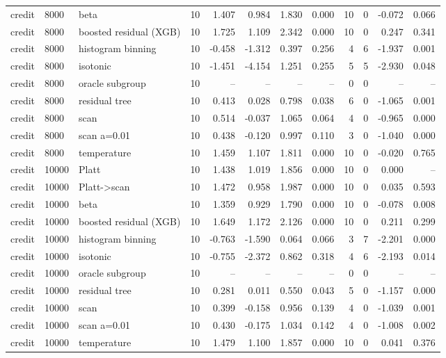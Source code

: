 \begin{tabular}{lllrrrrrrrrr}
credit & 8000 & beta & 10 & 1.407 & 0.984 & 1.830 & 0.000 & 10 & 0 & -0.072 & 0.066 \\
credit & 8000 & boosted residual (XGB) & 10 & 1.725 & 1.109 & 2.342 & 0.000 & 10 & 0 & 0.247 & 0.341 \\
credit & 8000 & histogram binning & 10 & -0.458 & -1.312 & 0.397 & 0.256 & 4 & 6 & -1.937 & 0.001 \\
credit & 8000 & isotonic & 10 & -1.451 & -4.154 & 1.251 & 0.255 & 5 & 5 & -2.930 & 0.048 \\
credit & 8000 & oracle subgroup & 10 & -- & -- & -- & -- & 0 & 0 & -- & -- \\
credit & 8000 & residual tree & 10 & 0.413 & 0.028 & 0.798 & 0.038 & 6 & 0 & -1.065 & 0.001 \\
credit & 8000 & scan & 10 & 0.514 & -0.037 & 1.065 & 0.064 & 4 & 0 & -0.965 & 0.000 \\
credit & 8000 & scan a=0.01 & 10 & 0.438 & -0.120 & 0.997 & 0.110 & 3 & 0 & -1.040 & 0.000 \\
credit & 8000 & temperature & 10 & 1.459 & 1.107 & 1.811 & 0.000 & 10 & 0 & -0.020 & 0.765 \\
credit & 10000 & Platt & 10 & 1.438 & 1.019 & 1.856 & 0.000 & 10 & 0 & 0.000 & -- \\
credit & 10000 & Platt->scan & 10 & 1.472 & 0.958 & 1.987 & 0.000 & 10 & 0 & 0.035 & 0.593 \\
credit & 10000 & beta & 10 & 1.359 & 0.929 & 1.790 & 0.000 & 10 & 0 & -0.078 & 0.008 \\
credit & 10000 & boosted residual (XGB) & 10 & 1.649 & 1.172 & 2.126 & 0.000 & 10 & 0 & 0.211 & 0.299 \\
credit & 10000 & histogram binning & 10 & -0.763 & -1.590 & 0.064 & 0.066 & 3 & 7 & -2.201 & 0.000 \\
credit & 10000 & isotonic & 10 & -0.755 & -2.372 & 0.862 & 0.318 & 4 & 6 & -2.193 & 0.014 \\
credit & 10000 & oracle subgroup & 10 & -- & -- & -- & -- & 0 & 0 & -- & -- \\
credit & 10000 & residual tree & 10 & 0.281 & 0.011 & 0.550 & 0.043 & 5 & 0 & -1.157 & 0.000 \\
credit & 10000 & scan & 10 & 0.399 & -0.158 & 0.956 & 0.139 & 4 & 0 & -1.039 & 0.001 \\
credit & 10000 & scan a=0.01 & 10 & 0.430 & -0.175 & 1.034 & 0.142 & 4 & 0 & -1.008 & 0.002 \\
credit & 10000 & temperature & 10 & 1.479 & 1.100 & 1.857 & 0.000 & 10 & 0 & 0.041 & 0.376 \\

\end{tabular}
